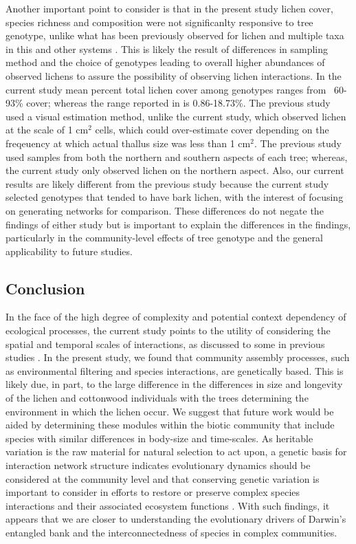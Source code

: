 \documentclass[11pt,twocolumn,twoside,lineno]{pnas-new}
\begin{document}
Another important point to consider is that in the present study
lichen cover, species richness and composition were not significanlty
responsive to tree genotype, unlike what has been previously observed
for lichen \cite{Lamit2015a} and multiple taxa in this and other
systems \cite{DesRoches2018TheVariation}. This is likely the result of
differences in sampling method and the choice of genotypes leading to
overall higher abundances of observed lichens to assure the
possibility of observing lichen interactions. In the current study
mean percent total lichen cover among genotypes ranges from ~60-93\%
cover; whereas the range reported in \citep{Lamit2015a} is
0.86-18.73\%.  The previous study used a visual estimation method,
unlike the current study, which observed lichen at the scale of 1
cm$^2$ cells, which could over-estimate cover depending on the
freqeuency at which actual thallus size was less than 1 cm$^2$.  The
previous study used samples from both the northern and southern
aspects of each tree; whereas, the current study only observed lichen
on the northern aspect.  Also, our current results are likely
different from the previous study because the current study selected
genotypes that tended to have bark lichen, with the interest of
focusing on generating networks for comparison. These differences do
not negate the findings of either study but is important to explain
the differences in the findings, particularly in the community-level
effects of tree genotype and the general applicability to future
studies.


\subsection*{Conclusion}

In the face of the high degree of complexity and potential context
dependency of ecological processes, the current study points to the
utility of considering the spatial and temporal scales of
interactions, as discussed to some in previous studies
\cite{Bangert2006, Zook2010, Zytynska2012}. In the present study, we
found that community assembly processes, such as environmental
filtering and species interactions, are genetically based. This is
likely due, in part, to the large difference in the differences in
size and longevity of the lichen and cottonwood individuals with the
trees determining the environment in which the lichen occur. We
suggest that future work would be aided by determining these modules
within the biotic community that include species with similar
differences in body-size and time-scales. As heritable variation is
the raw material for natural selection to act upon, a genetic basis
for interaction network structure indicates evolutionary dynamics
should be considered at the community level and that conserving
genetic variation is important to consider in efforts to restore or
preserve complex species interactions and their associated ecosystem
functions \cite{Evans2013}.  With such findings, it appears that we
are closer to understanding the evolutionary drivers of Darwin's
entangled bank and the interconnectedness of species in complex
communities.
\end{document}
